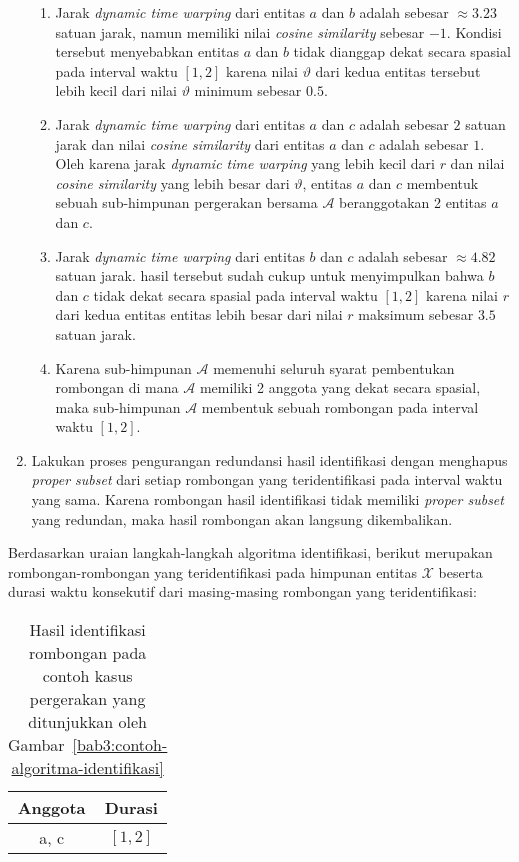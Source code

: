 \begin{enumerate}
    \begin{enumerate}
        \item Jarak \textit{dynamic time warping} dari entitas $a$ dan $b$ adalah sebesar $\approx 3.23$ satuan jarak, namun memiliki nilai \textit{cosine similarity} sebesar $-1$. Kondisi tersebut menyebabkan entitas $a$ dan $b$ tidak dianggap dekat secara spasial pada interval waktu $[1, 2]$ karena nilai $\vartheta$ dari kedua entitas tersebut lebih kecil dari nilai $\vartheta$ minimum sebesar $0.5$.
        \item Jarak \textit{dynamic time warping} dari entitas $a$ dan $c$ adalah sebesar $2$ satuan jarak dan nilai \textit{cosine similarity} dari entitas $a$ dan $c$ adalah sebesar $1$. Oleh karena jarak \textit{dynamic time warping} yang lebih kecil dari $r$ dan nilai \textit{cosine similarity} yang lebih besar dari $\vartheta$, entitas $a$ dan $c$ membentuk sebuah sub-himpunan pergerakan bersama $\mathcal{A}$ beranggotakan 2 entitas $a$ dan $c$.
        \item Jarak \textit{dynamic time warping} dari entitas $b$ dan $c$ adalah sebesar $\approx 4.82$ satuan jarak. hasil tersebut sudah cukup untuk menyimpulkan bahwa $b$ dan $c$ tidak dekat secara spasial pada interval waktu $[1, 2]$ karena nilai $r$ dari kedua entitas entitas lebih besar dari nilai $r$ maksimum sebesar $3.5$ satuan jarak.
        \item Karena sub-himpunan $\mathcal{A}$ memenuhi seluruh syarat pembentukan rombongan di mana $\mathcal{A}$ memiliki 2 anggota yang dekat secara spasial, maka sub-himpunan $\mathcal{A}$ membentuk sebuah rombongan pada interval waktu $[1, 2]$.
    \end{enumerate}
    
    \clearpage
    
    \item Lakukan proses pengurangan redundansi hasil identifikasi dengan menghapus \textit{proper subset} dari setiap rombongan yang teridentifikasi pada interval waktu yang sama. Karena rombongan hasil identifikasi tidak memiliki \textit{proper subset} yang redundan, maka hasil rombongan akan langsung dikembalikan.
\end{enumerate}

Berdasarkan uraian langkah-langkah algoritma identifikasi, berikut merupakan rombongan-rombongan yang teridentifikasi pada himpunan entitas $\mathcal{X}$ beserta durasi waktu konsekutif dari masing-masing rombongan yang teridentifikasi:

\begin{table}[h]
    \centering
    \captionsetup{width=0.6\textwidth}
    \caption{Hasil identifikasi rombongan pada contoh kasus pergerakan yang ditunjukkan oleh Gambar~\ref{bab3:contoh-algoritma-identifikasi}}
    \begin{tabular}{|c|c|}
        \hline
        Anggota & Durasi \\
        \hline
        a, c & $[1, 2]$ \\
        \hline
    \end{tabular}
    \label{bab6:contoh-identifikasi-non-redundan}
\end{table}


